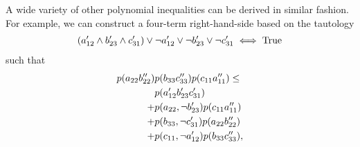 A wide variety of other polynomial inequalities can be derived in similar fashion. For example, we can construct a four-term right-hand-side based on the tautology 
\begin{align*}
\parens*{a'_{12} \land b'_{23} \land c'_{31}} \lor \na'_{12} \lor \nb'_{23} \lor \nc'_{31}  \iff \mbox{True}
\end{align*}
such that
%
%
\begin{align}\begin{split}\label{eq:thirdsurety}
\p{a_{22} b''_{22}}&\p{b_{33} c''_{33}}\p{c_{11} a''_{11}}\leq
\\ &\p{a'_{12} b'_{23} c'_{31}}
\\+&\p{a_{22},\nb'_{23}}\p{c_{11} a''_{11}}
\\+&\p{b_{33},\nc'_{31}}\p{a_{22} b''_{22}}
\\+&\p{c_{11},\na'_{12}}\p{b_{33} c''_{33}},
\end{split}\end{align}
